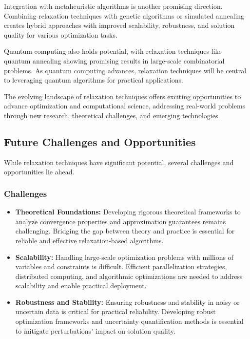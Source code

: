\documentclass[12pt]{book} %
\begin{document}
Integration with metaheuristic algorithms is another promising direction. Combining relaxation techniques with genetic algorithms or simulated annealing creates hybrid approaches with improved scalability, robustness, and solution quality for various optimization tasks.

Quantum computing also holds potential, with relaxation techniques like quantum annealing showing promising results in large-scale combinatorial problems. As quantum computing advances, relaxation techniques will be central to leveraging quantum algorithms for practical applications.

The evolving landscape of relaxation techniques offers exciting opportunities to advance optimization and computational science, addressing real-world problems through new research, theoretical challenges, and emerging technologies.

\subsection{Future Challenges and Opportunities}

While relaxation techniques have significant potential, several challenges and opportunities lie ahead.

\subsubsection{Challenges}

\begin{itemize}
    \item \textbf{Theoretical Foundations:} Developing rigorous theoretical frameworks to analyze convergence properties and approximation guarantees remains challenging. Bridging the gap between theory and practice is essential for reliable and effective relaxation-based algorithms.
    \item \textbf{Scalability:} Handling large-scale optimization problems with millions of variables and constraints is difficult. Efficient parallelization strategies, distributed computing, and algorithmic optimizations are needed to address scalability and enable practical deployment.
    \item \textbf{Robustness and Stability:} Ensuring robustness and stability in noisy or uncertain data is critical for practical reliability. Developing robust optimization frameworks and uncertainty quantification methods is essential to mitigate perturbations' impact on solution quality.
\end{itemize}
\end{document}
